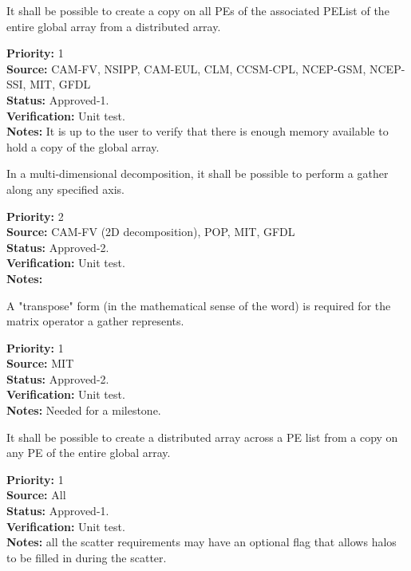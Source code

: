
It shall be possible to create a copy on all PEs of the associated
PEList of the entire global array from a distributed array.

\begin{reqlist}
{\bf Priority:} 1 \\ 
{\bf Source:} CAM-FV, NSIPP, CAM-EUL, CLM, CCSM-CPL, NCEP-GSM, NCEP-SSI, MIT, GFDL \\
{\bf Status:} Approved-1. \\
{\bf Verification:} Unit test. \\
{\bf Notes:} It is up to the user to verify that there is enough
memory available to hold a copy of the global array.
\end{reqlist}

 \label{DG:PartGather}

In a multi-dimensional decomposition, it shall be possible to perform
a gather along any specified axis.

\begin{reqlist}
{\bf Priority:} 2 \\ 
{\bf Source:} CAM-FV (2D decomposition), POP, MIT, GFDL \\
{\bf Status:} Approved-2. \\
{\bf Verification:} Unit test. \\
{\bf Notes:} 
\end{reqlist}

A "transpose" form (in the mathematical sense of the word) is required
for the matrix operator a gather represents.
\begin{reqlist}
{\bf Priority:} 1 \\ 
{\bf Source:}  MIT \\
{\bf Status:} Approved-2. \\
{\bf Verification:} Unit test. \\
{\bf Notes:} Needed for a milestone.
\end{reqlist}


It shall be possible to create a distributed array across a PE list
from a copy on any PE of the entire global array.

\begin{reqlist}
{\bf Priority:} 1 \\ 
{\bf Source:} All\\
{\bf Status:} Approved-1. \\
{\bf Verification:} Unit test. \\
{\bf Notes:} all the scatter requirements may have an optional flag
that allows halos to be filled in during the scatter.
\end{reqlist}

